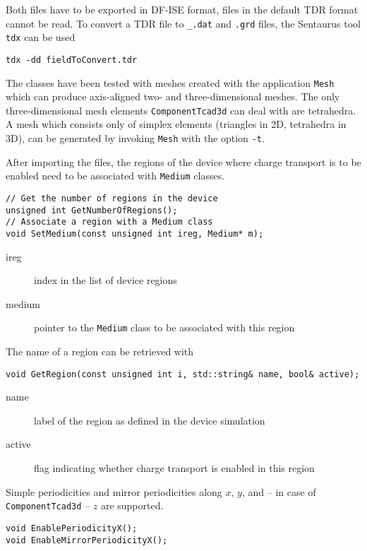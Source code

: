 Both files have to be exported in DF-ISE format, 
files in the default TDR format cannot be read.
To convert a TDR file to \texttt{\_.dat} and \texttt{.grd} files, the
Sentaurus tool \texttt{tdx} can be used
\begin{lstlisting}
tdx -dd fieldToConvert.tdr
\end{lstlisting}

The classes have been tested with meshes created with the application 
\texttt{Mesh} which can produce axis-aligned 
two- and three-dimensional meshes.
The only three-dimensional mesh elements \texttt{ComponentTcad3d} 
can deal with are tetrahedra. 
A mesh which consists only of simplex elements 
(triangles in 2D, tetrahedra in 3D), 
can be generated by invoking \texttt{Mesh} with the option \texttt{-t}.

After importing the files, 
the regions of the device where charge transport is to be enabled 
need to be associated with \texttt{Medium} classes. 
\begin{lstlisting}
// Get the number of regions in the device
unsigned int GetNumberOfRegions();
// Associate a region with a Medium class
void SetMedium(const unsigned int ireg, Medium* m);
\end{lstlisting}
\begin{description}
  \item[ireg]
  index in the list of device regions
  \item[medium]
  pointer to the \texttt{Medium} class to be associated with this region
\end{description}

The name of a region can be retrieved with
\begin{lstlisting}
void GetRegion(const unsigned int i, std::string& name, bool& active);
\end{lstlisting}
\begin{description}
  \item[name] 
  label of the region as defined in the device simulation
  \item[active] 
  flag indicating whether charge transport is enabled 
  in this region
\end{description}

Simple periodicities and mirror periodicities along 
\(x\), \(y\), and -- in case of \texttt{ComponentTcad3d} -- \(z\) 
are supported. 
\begin{lstlisting}
void EnablePeriodicityX();
void EnableMirrorPeriodicityX();
\end{lstlisting}

